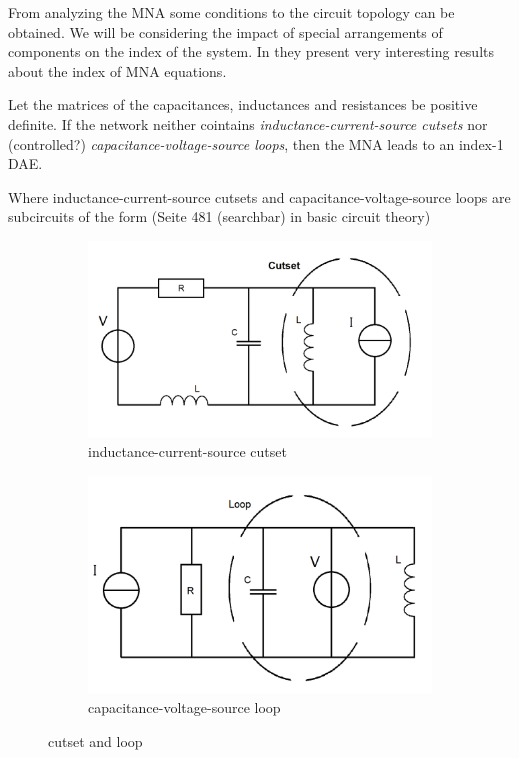 From analyzing the MNA some conditions to the circuit topology can be obtained. We will be considering the impact of special arrangements of components on the index of the system. In \cite{Tischendorf2005Topological} they present very interesting results about the index of MNA equations.


\begin{theorem} \label{Index-1 condition}
	Let the matrices of the capacitances, inductances and resistances be positive definite. If the network neither cointains \emph{inductance-current-source cutsets} nor (controlled?) \emph{capacitance-voltage-source loops}, then the MNA leads to an index-1 DAE.
\end{theorem}

Where inductance-current-source cutsets and capacitance-voltage-source loops are subcircuits of the form (Seite 481 (searchbar) in basic circuit theory)

\begin{figure}[H]
	\begin{subfigure}{0.5\textwidth}
		\centering
		\includegraphics[width=0.9\linewidth]{pictures/inductance-current-source_cutset.png}
		\caption{inductance-current-source cutset}
	\end{subfigure}
	\begin{subfigure}{0.5\textwidth}
		\centering
		\includegraphics[width=0.9\linewidth]{pictures/capacitance-voltage-source_loop.png}
		\caption{capacitance-voltage-source loop}
	\end{subfigure}
	\label{cutset and loop}
	\caption{cutset and loop}
\end{figure}

